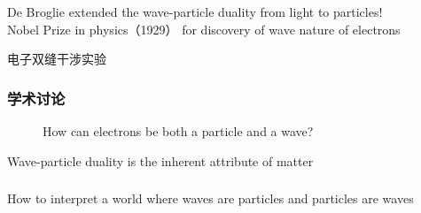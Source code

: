 \begin{frame} 
    \begin{tcolorbox}[colback=yellow!10,colframe=red!75!black,title=Significance]
        De Broglie extended the wave-particle duality from light to particles! \\
        {\color{deepred} Nobel Prize in physics（1929）} for discovery of wave nature of electrons
    \end{tcolorbox}  
\end{frame}

\begin{frame}{电子双缝干涉实验}
\end{frame}

\begin{frame}
    \frametitle{学术讨论}
        \begin{figure}
            \centering
            {\color{red} How can electrons be both a particle and a wave?}
        \end{figure}
    \setcounter{subfigure}{0}
\end{frame}

\begin{frame}  
    \begin{tcolorbox3}[Conclusion]
    Wave-particle duality is the inherent attribute of matter
    \end{tcolorbox3} 
\end{frame} 

\begin{frame}
    \frametitle{}
    \centering
    {
      \large  How to interpret a world where waves are particles and particles are waves
    }
\end{frame}

